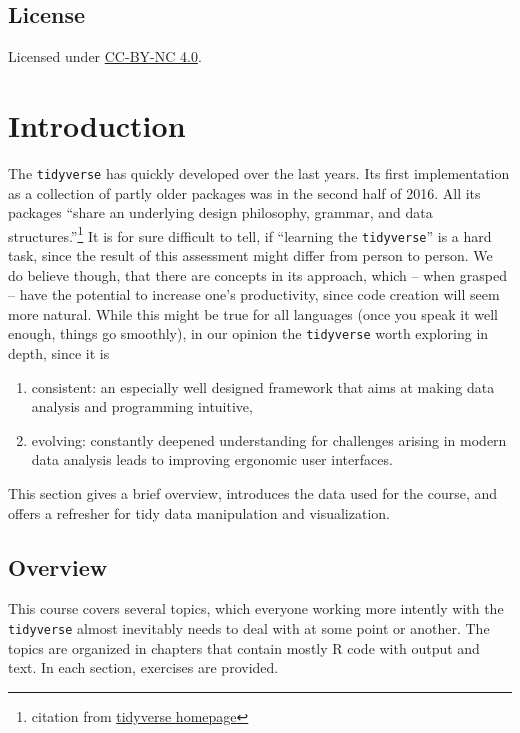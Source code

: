 \documentclass[]{book}
\providecommand{\tightlist}{%
  \setlength{\itemsep}{0pt}\setlength{\parskip}{0pt}}
\let\rmarkdownfootnote\footnote%
\def\footnote{\protect\rmarkdownfootnote}
\begin{document}
\hypertarget{license}{%
\section{License}\label{license}}

Licensed under \href{https://creativecommons.org/licenses/by-nc/4.0/}{CC-BY-NC 4.0}.

\hypertarget{introduction}{%
\chapter{Introduction}\label{introduction}}

The \texttt{tidyverse} has quickly developed over the last years.
Its first implementation as a collection of partly older packages was in the second half of 2016.
All its packages ``share an underlying design philosophy, grammar, and data structures.''\footnote{citation from \href{https://www.tidyverse.org/}{tidyverse homepage}}
It is for sure difficult to tell, if ``learning the \texttt{tidyverse}'' is a hard task, since the result of this assessment might differ from person to person.
We do believe though, that there are concepts in its approach, which -- when grasped -- have the potential to increase one's productivity, since code creation will seem more natural.
While this might be true for all languages (once you speak it well enough, things go smoothly), in our opinion the \texttt{tidyverse} worth exploring in depth, since it is

\begin{enumerate}
\def\labelenumi{\arabic{enumi}.}
\tightlist
\item
  consistent: an especially well designed framework that aims at making data analysis and programming intuitive,
\item
  evolving: constantly deepened understanding for challenges arising in modern data analysis leads to improving ergonomic user interfaces.
\end{enumerate}

This section gives a brief overview, introduces the data used for the course, and offers a refresher for tidy data manipulation and visualization.

\hypertarget{overview}{%
\section{Overview}\label{overview}}

This course covers several topics, which everyone working more intently with the \texttt{tidyverse} almost inevitably needs to deal with at some point or another.
The topics are organized in chapters that contain mostly R code with output and text.
In each section, exercises are provided.
\end{document}
